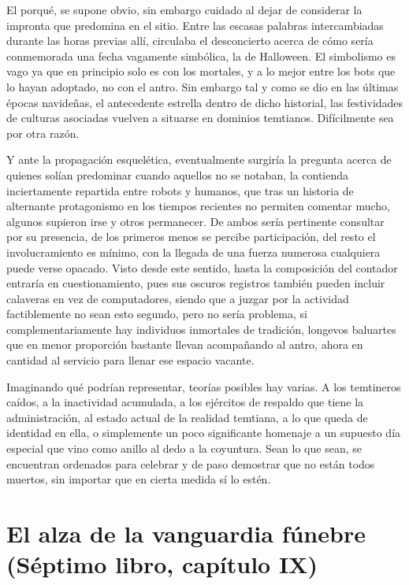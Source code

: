 \documentclass[
]{book}
\begin{document}
El porqué, se supone obvio, sin embargo cuidado al dejar de considerar la impronta que predomina en el sitio. Entre las escasas palabras intercambiadas durante las horas previas allí, circulaba el desconcierto acerca de cómo sería conmemorada una fecha vagamente simbólica, la de Halloween. El simbolismo es vago ya que en principio solo es con los mortales, y a lo mejor entre los bots que lo hayan adoptado, no con el antro. Sin embargo tal y como se dio en las últimas épocas navideñas, el antecedente estrella dentro de dicho historial, las festividades de culturas asociadas vuelven a situarse en dominios temtianos. Difícilmente sea por otra razón.

Y ante la propagación esquelética, eventualmente surgiría la pregunta acerca de quienes solían predominar cuando aquellos no se notaban, la contienda inciertamente repartida entre robots y humanos, que tras un historia de alternante protagonismo en los tiempos recientes no permiten comentar mucho, algunos supieron irse y otros permanecer. De ambos sería pertinente consultar por su presencia, de los primeros menos se percibe participación, del resto el involucramiento es mínimo, con la llegada de una fuerza numerosa cualquiera puede verse opacado. Visto desde este sentido, hasta la composición del contador entraría en cuestionamiento, pues sus oscuros registros también pueden incluir calaveras en vez de computadores, siendo que a juzgar por la actividad factiblemente no sean esto segundo, pero no sería problema, si complementariamente hay individuos inmortales de tradición, longevos baluartes que en menor proporción bastante llevan acompañando al antro, ahora en cantidad al servicio para llenar ese espacio vacante.

Imaginando qué podrían representar, teorías posibles hay varias. A los temtineros caídos, a la inactividad acumulada, a los ejércitos de respaldo que tiene la administración, al estado actual de la realidad temtiana, a lo que queda de identidad en ella, o simplemente un poco significante homenaje a un supuesto día especial que vino como anillo al dedo a la coyuntura. Sean lo que sean, se encuentran ordenados para celebrar y de paso demostrar que no están todos muertos, sin importar que en cierta medida sí lo estén.

\hypertarget{el-alza-de-la-vanguardia-fuxfanebre-suxe9ptimo-libro-capuxedtulo-ix}{%
\section{El alza de la vanguardia fúnebre (Séptimo libro, capítulo IX)}\label{el-alza-de-la-vanguardia-fuxfanebre-suxe9ptimo-libro-capuxedtulo-ix}}
\end{document}
